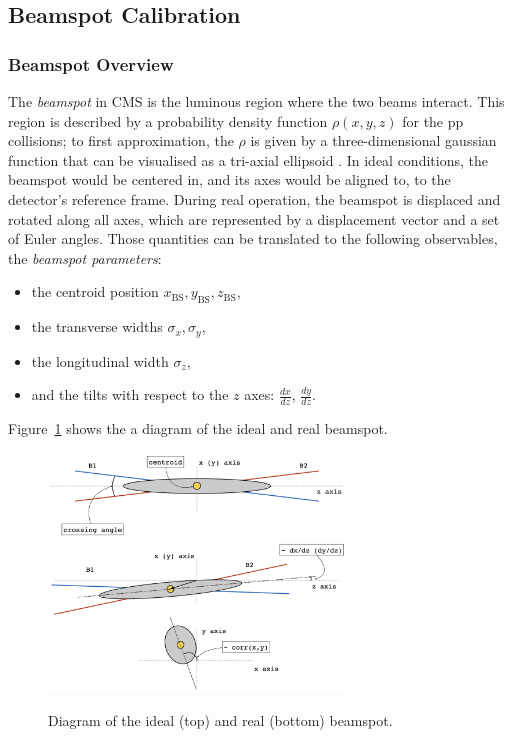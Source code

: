 \subsection{Beamspot Calibration}

\subsubsection{Beamspot Overview}

The \emph{beamspot} in CMS is the luminous region where the two beams interact.
This region is described by a probability density function $\rho(x,y,z)$ for the pp collisions;
to first approximation, the $\rho$ is given by a three-dimensional gaussian function that can be visualised as a tri-axial ellipsoid \cite{CMS-PAS-TRK-10-005}.
In ideal conditions, the beamspot would be centered in,
and its axes would be aligned to,
to the detector's reference frame.
During real operation, the beamspot is displaced and rotated along all axes,
which are represented by a displacement vector and a set of Euler angles.
Those quantities can be translated to the following observables, the \emph{beamspot parameters}:
\begin{itemize}
\item the centroid position $x_{\text{BS}}, y_{\text{BS}}, z_{\text{BS}}$,
\item the transverse widths $\sigma_{x}, \sigma_{y}$,
\item the longitudinal width $\sigma_{z}$,
\item and the tilts with respect to the $z$ axes: $\frac{dx}{dz}$, $\frac{dy}{dz}$.
\end{itemize}
Figure~\ref{fig:beamspotCartoon} shows the a diagram of the ideal and real beamspot.
\begin{figure}[htbp]
   \centering
\includegraphics[width=0.7\textwidth]{figures/IdealBeamspot.png}\\[2ex]
\includegraphics[width=0.7\textwidth]{figures/RealBeamspot.png}
   \caption{Diagram of the ideal (top) and real (bottom) beamspot.}
   \label{fig:beamspotCartoon}
\end{figure}

